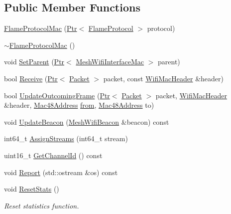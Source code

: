 \subsection*{Public Member Functions}
\begin{DoxyCompactItemize}
\item 
\hyperlink{classns3_1_1flame_1_1FlameProtocolMac_a96f20608cb1f2995b5b3771d776143ac}{Flame\+Protocol\+Mac} (\hyperlink{classns3_1_1Ptr}{Ptr}$<$ \hyperlink{classns3_1_1flame_1_1FlameProtocol}{Flame\+Protocol} $>$ protocol)
\item 
\hyperlink{classns3_1_1flame_1_1FlameProtocolMac_ae7f69650afed89ee69f0ae956146cf77}{$\sim$\+Flame\+Protocol\+Mac} ()
\item 
void \hyperlink{classns3_1_1flame_1_1FlameProtocolMac_a0b641a8071339489ce93f095ba641e87}{Set\+Parent} (\hyperlink{classns3_1_1Ptr}{Ptr}$<$ \hyperlink{classns3_1_1MeshWifiInterfaceMac}{Mesh\+Wifi\+Interface\+Mac} $>$ parent)
\item 
bool \hyperlink{classns3_1_1flame_1_1FlameProtocolMac_acbb5e05076cc472cdd9dbb57eda73091}{Receive} (\hyperlink{classns3_1_1Ptr}{Ptr}$<$ \hyperlink{classns3_1_1Packet}{Packet} $>$ packet, const \hyperlink{classns3_1_1WifiMacHeader}{Wifi\+Mac\+Header} \&header)
\item 
bool \hyperlink{classns3_1_1flame_1_1FlameProtocolMac_a2f27306682cf1ea601d7fd9a37d8b875}{Update\+Outcoming\+Frame} (\hyperlink{classns3_1_1Ptr}{Ptr}$<$ \hyperlink{classns3_1_1Packet}{Packet} $>$ packet, \hyperlink{classns3_1_1WifiMacHeader}{Wifi\+Mac\+Header} \&header, \hyperlink{classns3_1_1Mac48Address}{Mac48\+Address} \hyperlink{lte__amc_8m_a1b4c81ff74eb1a626b5ade44c81004b3}{from}, \hyperlink{classns3_1_1Mac48Address}{Mac48\+Address} to)
\item 
void \hyperlink{classns3_1_1flame_1_1FlameProtocolMac_ab62bdf8c9a1da13a9bb271ad538aa103}{Update\+Beacon} (\hyperlink{classns3_1_1MeshWifiBeacon}{Mesh\+Wifi\+Beacon} \&beacon) const 
\item 
int64\+\_\+t \hyperlink{classns3_1_1flame_1_1FlameProtocolMac_ab5e94836eab2e9502f765c72a0a4e8a3}{Assign\+Streams} (int64\+\_\+t stream)
\item 
uint16\+\_\+t \hyperlink{classns3_1_1flame_1_1FlameProtocolMac_a2d54e309bee99dcb16bf3a37eab06336}{Get\+Channel\+Id} () const 
\item 
void \hyperlink{classns3_1_1flame_1_1FlameProtocolMac_a1c5dbe2b2a9705f8f752a42807140f0d}{Report} (std\+::ostream \&os) const 
\item 
void \hyperlink{classns3_1_1flame_1_1FlameProtocolMac_a5f8fa8079b0d3f1d94ab8264ea13b449}{Reset\+Stats} ()
\begin{DoxyCompactList}\small\item\em Reset statistics function. \end{DoxyCompactList}\end{DoxyCompactItemize}
